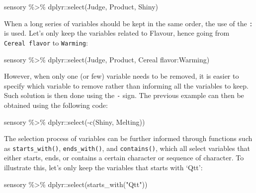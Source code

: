 \documentclass[
]{book}
\newenvironment{Shaded}{\begin{snugshade}}{\end{snugshade}}
\newcommand{\AttributeTok}[1]{\textcolor[rgb]{0.77,0.63,0.00}{#1}}
\newcommand{\FunctionTok}[1]{\textcolor[rgb]{0.00,0.00,0.00}{#1}}
\newcommand{\NormalTok}[1]{#1}
\newcommand{\SpecialCharTok}[1]{\textcolor[rgb]{0.00,0.00,0.00}{#1}}
\newcommand{\StringTok}[1]{\textcolor[rgb]{0.31,0.60,0.02}{#1}}
\begin{document}
\begin{Shaded}
\begin{Highlighting}[]
\NormalTok{sensory }\SpecialCharTok{\%\textgreater{}\%} 
\NormalTok{  dplyr}\SpecialCharTok{::}\FunctionTok{select}\NormalTok{(Judge, Product, Shiny)}
\end{Highlighting}
\end{Shaded}

When a long series of variables should be kept in the same order, the use of the \texttt{:} is used.
Let's only keep the variables related to Flavour, hence going from \texttt{Cereal\ flavor} to \texttt{Warming}:

\begin{Shaded}
\begin{Highlighting}[]
\NormalTok{sensory }\SpecialCharTok{\%\textgreater{}\%} 
\NormalTok{  dplyr}\SpecialCharTok{::}\FunctionTok{select}\NormalTok{(Judge, Product, }\StringTok{\textasciigrave{}}\AttributeTok{Cereal flavor}\StringTok{\textasciigrave{}}\SpecialCharTok{:}\NormalTok{Warming)}
\end{Highlighting}
\end{Shaded}

However, when only one (or few) variable needs to be removed, it is easier to specify which variable to remove rather than informing all the variables to keep. Such solution is then done using the \texttt{-} sign. The previous example can then be obtained using the following code:

\begin{Shaded}
\begin{Highlighting}[]
\NormalTok{sensory }\SpecialCharTok{\%\textgreater{}\%} 
\NormalTok{  dplyr}\SpecialCharTok{::}\FunctionTok{select}\NormalTok{(}\SpecialCharTok{{-}}\FunctionTok{c}\NormalTok{(Shiny, Melting))}
\end{Highlighting}
\end{Shaded}

The selection process of variables can be further informed through functions such as \texttt{starts\_with()}, \texttt{ends\_with()}, and \texttt{contains()}, which all select variables that either starts, ends, or contains a certain character or sequence of character. To illustrate this, let's only keep the variables that starts with `Qtt':

\begin{Shaded}
\begin{Highlighting}[]
\NormalTok{sensory }\SpecialCharTok{\%\textgreater{}\%} 
\NormalTok{  dplyr}\SpecialCharTok{::}\FunctionTok{select}\NormalTok{(}\FunctionTok{starts\_with}\NormalTok{(}\StringTok{"Qtt"}\NormalTok{))}
\end{Highlighting}
\end{Shaded}
\end{document}

